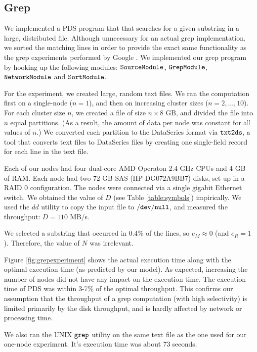 \documentclass{acm_proc_article-sp}
\begin{document}
\subsection{Grep}

We implemented a PDS program that that searches for a given substring in
a large, distributed file. Although unnecessary for an actual grep
implementation, we sorted the matching lines in order to provide the exact same
functionality as the grep experiments performed by Google \cite{mapreduce}. We
implemented our grep program by hooking up the following modules:
$\tt SourceModule$, $\tt GrepModule$, $\tt NetworkModule$ and $\tt SortModule$.

For the experiment, we created large, random text files. We ran the computation
first on a single-node ($n = 1$), and then on increasing cluster sizes ($n = 2,
\ldots, 10$). For each cluster size $n$, we created a file of size $n \times 8$
GB, and divided the file into $n$ equal partitions. (As a result, the amount
of data per node was constant for all values of $n$.) We converted each
partition to the DataSeries format via $\tt txt2ds$, a tool that converts text files to DataSeries files by creating one single-field record for each line in
the text file.

Each of our nodes had four dual-core AMD Operaton 2.4 GHz CPUs and 4 GB of RAM.
Each node had two 72 GB SAS (HP DG072A9BB7) disks, set up in a RAID 0
configuration. The nodes were connected via a single gigabit Ethernet switch.
We obtained the value of $D$ (see Table \ref{table:symbols})
impirically. We used the $dd$ utility to copy the input file to $\tt /dev/null$,
and measured the throughput: $D = 110$ MB/s.

We selected a
substring that occurred in 0.4\% of the lines, so $e_M \approx 0$ (and $e_R =
1$). Therefore, the value of $N$ was irrelevant.

Figure \ref{fig:grepexperiment} shows the actual execution time along with the optimal
execution time (as predicted by our model). As expected, increasing the number
of nodes did not have any impact on the execution time. The execution time of
PDS was within 3-7\% of the optimal throughput. This confirms our assumption that
the throughput of a grep computation (with high selectivity) is limited
primarily by the disk throughput, and is hardly affected by network or
processing time.

We also ran the UNIX $\tt grep$ utility on the same text file as the one used
for our one-node experiment. It's execution time was about 73 seconds.
\end{document}
